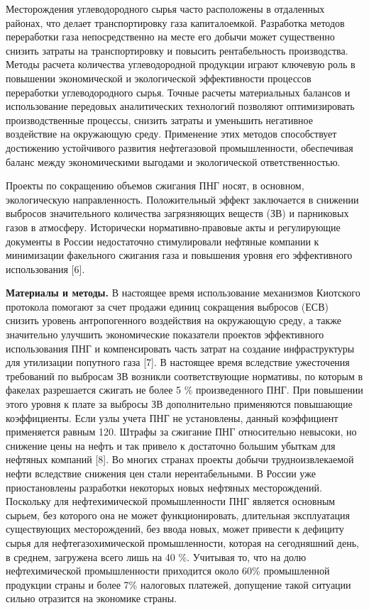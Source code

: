 \begin{multicols}{2}
Месторождения углеводородного сырья часто расположены в отдаленных
районах, что делает транспортировку газа капиталоемкой. Разработка
методов переработки газа непосредственно на месте его добычи может
существенно снизить затраты на транспортировку и повысить рентабельность
производства. Методы расчета количества углеводородной продукции играют
ключевую роль в повышении экономической и экологической эффективности
процессов переработки углеводородного сырья. Точные расчеты материальных
балансов и использование передовых аналитических технологий позволяют
оптимизировать производственные процессы, снизить затраты и уменьшить
негативное воздействие на окружающую среду. Применение этих методов
способствует достижению устойчивого развития нефтегазовой
промышленности, обеспечивая баланс между экономическими выгодами и
экологической ответственностью.

Проекты по сокращению объемов сжигания ПНГ носят, в основном,
экологическую направленность. Положительный эффект заключается в
снижении выбросов значительного количества загрязняющих веществ (ЗВ) и
парниковых газов в атмосферу. Исторически нормативно-правовые акты и
регулирующие документы в России недостаточно стимулировали нефтяные
компании к минимизации факельного сжигания газа и повышения уровня его
эффективного использования {[}6{]}.

{\bfseries Материалы и методы.} В настоящее время использование механизмов
Киотского протокола помогают за счет продажи единиц сокращения выбросов
(ЕСВ) снизить уровень антропогенного воздействия на окружающую среду, а
также значительно улучшить экономические показатели проектов
эффективного использования ПНГ и компенсировать часть затрат на создание
инфраструктуры для утилизации попутного газа {[}7{]}. В настоящее время
вследствие ужесточения требований по выбросам ЗВ возникли
соответствующие нормативы, по которым в факелах разрешается сжигать не
более 5 \% произведенного ПНГ. При повышении этого уровня к плате за
выбросы ЗВ дополнительно применяются повышающие коэффициенты. Если узлы
учета ПНГ не установлены, данный коэффициент применяется равным 120.
Штрафы за сжигание ПНГ относительно невысоки, но снижение цены на нефть
и так привело к достаточно большим убыткам для нефтяных компаний
{[}8{]}. Во многих странах проекты добычи трудноизвлекаемой нефти
вследствие снижения цен стали нерентабельными. В России уже
приостановлены разработки некоторых новых нефтяных месторождений.
Поскольку для нефтехимической промышленности ПНГ является основным
сырьем, без которого она не может функционировать, длительная
эксплуатация существующих месторождений, без ввода новых, может привести
к дефициту сырья для нефтегазохимической промышленности, которая на
сегодняшний день, в среднем, загружена всего лишь на 40 \%. Учитывая то,
что на долю нефтехимической промышленности приходится около 60\%
промышленной продукции страны и более 7\% налоговых платежей, допущение
такой ситуации сильно отразится на экономике страны.


\end{multicols}
